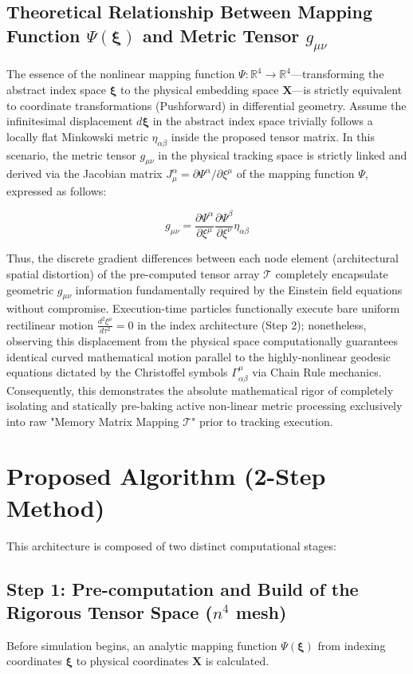 \documentclass[11pt]{article}
\begin{document}
\subsection{Theoretical Relationship Between Mapping Function $\Psi(\boldsymbol{\xi})$ and Metric Tensor $g_{\mu\nu}$}
The essence of the nonlinear mapping function $\Psi: \mathbb{R}^4 \to \mathbb{R}^4$—transforming the abstract index space $\boldsymbol{\xi}$ to the physical embedding space $\mathbf{X}$—is strictly equivalent to coordinate transformations (Pushforward) in differential geometry.
Assume the infinitesimal displacement $d\boldsymbol{\xi}$ in the abstract index space trivially follows a locally flat Minkowski metric $\eta_{\alpha\beta}$ inside the proposed tensor matrix. In this scenario, the metric tensor $g_{\mu\nu}$ in the physical tracking space is strictly linked and derived via the Jacobian matrix $J^\alpha_\mu = \partial \Psi^\alpha / \partial \xi^\mu$ of the mapping function $\Psi$, expressed as follows:

\[ g_{\mu\nu} = \frac{\partial \Psi^\alpha}{\partial \xi^\mu} \frac{\partial \Psi^\beta}{\partial \xi^\nu} \eta_{\alpha\beta} \]

Thus, the discrete gradient differences between each node element (architectural spatial distortion) of the pre-computed tensor array $\mathcal{T}$ completely encapsulate geometric $g_{\mu\nu}$ information fundamentally required by the Einstein field equations without compromise. Execution-time particles functionally execute bare uniform rectilinear motion $\frac{d^2 \xi^\mu}{d\tau^2} = 0$ in the index architecture (Step 2); nonetheless, observing this displacement from the physical space computationally guarantees identical curved mathematical motion parallel to the highly-nonlinear geodesic equations dictated by the Christoffel symbols $\Gamma^\mu_{\alpha\beta}$ via Chain Rule mechanics. Consequently, this demonstrates the absolute mathematical rigor of completely isolating and statically pre-baking active non-linear metric processing exclusively into raw "Memory Matrix Mapping $\mathcal{T}$" prior to tracking execution.

\section{Proposed Algorithm (2-Step Method)}
This architecture is composed of two distinct computational stages:

\subsection{Step 1: Pre-computation and Build of the Rigorous Tensor Space ($n^4$ mesh)}
Before simulation begins, an analytic mapping function $\Psi(\boldsymbol{\xi})$ from indexing coordinates $\boldsymbol{\xi}$ to physical coordinates $\mathbf{X}$ is calculated.
\end{document}

